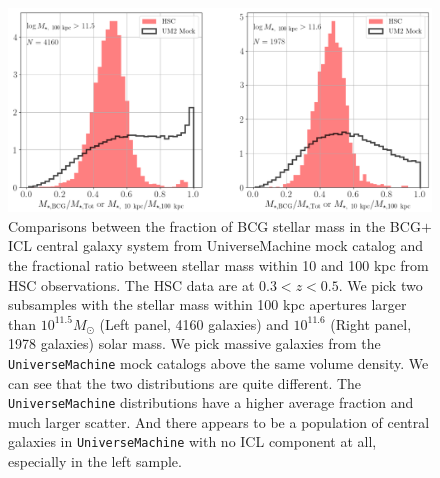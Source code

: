 \documentclass[a4paper,fleqn,usenatbib]{mnras}
\def\um{\texttt{UniverseMachine}}
\begin{document}
    \begin{figure}
        \centering 
        \includegraphics[width=\textwidth]{fig/um2_mbcg_mtot_frac}
            \caption{
                Comparisons between the fraction of BCG stellar mass in the BCG$+$ICL 
                central galaxy system from UniverseMachine mock catalog and the 
                fractional ratio between stellar mass within 10 and 100 kpc from HSC 
                observations.  
                The HSC data are at $0.3 < z < 0.5$.  
                We pick two subsamples with the stellar mass within 100 kpc apertures 
                larger than $10^{11.5} M_{\odot}$ (Left panel, 4160 galaxies) and 
                $10^{11.6}$ (Right panel, 1978 galaxies) solar mass.  
                We pick massive galaxies from the \um{} mock catalogs above the same 
                volume density.  
                We can see that the two distributions are quite different.  
                The \um{} distributions have a higher average fraction and much 
                larger scatter.  
                And there appears to be a population of central galaxies in \um{} with 
                no ICL component at all, especially in the left sample.
                }
        \label{fig:um2_m100_m10_1}
    \end{figure}

\bsp
\label{lastpage}
\end{document}
